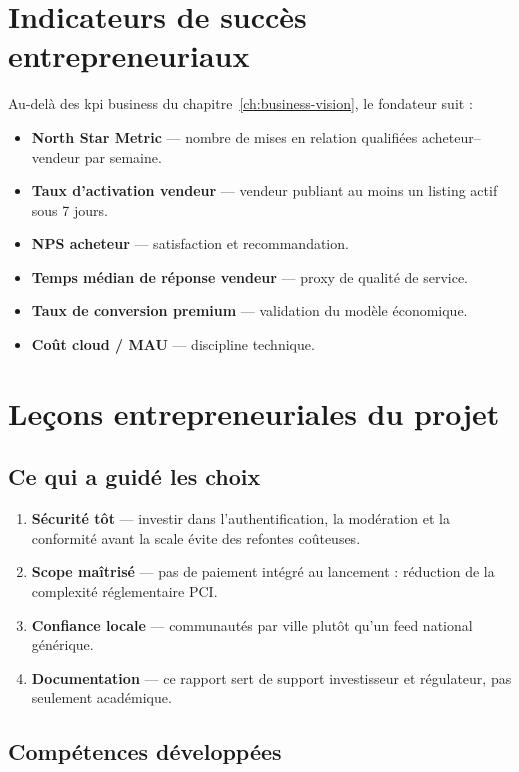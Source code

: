 \section{Indicateurs de succès entrepreneuriaux}

Au-delà des \gls{kpi} business du chapitre~\ref{ch:business-vision}, le fondateur suit :

\begin{itemize}
  \item \textbf{North Star Metric} --- nombre de mises en relation qualifiées acheteur--vendeur par semaine.
  \item \textbf{Taux d'activation vendeur} --- vendeur publiant au moins un listing actif sous 7 jours.
  \item \textbf{NPS acheteur} --- satisfaction et recommandation.
  \item \textbf{Temps médian de réponse vendeur} --- proxy de qualité de service.
  \item \textbf{Taux de conversion premium} --- validation du modèle économique.
  \item \textbf{Coût cloud / MAU} --- discipline technique.
\end{itemize}

\section{Leçons entrepreneuriales du projet}

\subsection{Ce qui a guidé les choix}

\begin{enumerate}
  \item \textbf{Sécurité tôt} --- investir dans l'authentification, la modération et la conformité avant la scale évite des refontes coûteuses.
  \item \textbf{Scope maîtrisé} --- pas de paiement intégré au lancement : réduction de la complexité réglementaire PCI.
  \item \textbf{Confiance locale} --- communautés par ville plutôt qu'un feed national générique.
  \item \textbf{Documentation} --- ce rapport sert de support investisseur et régulateur, pas seulement académique.
\end{enumerate}

\subsection{Compétences développées}

